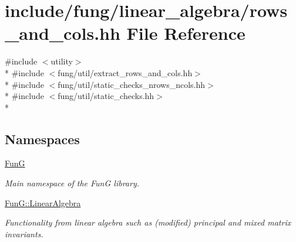 \hypertarget{rows__and__cols_8hh}{\section{include/fung/linear\-\_\-algebra/rows\-\_\-and\-\_\-cols.hh File Reference}
\label{rows__and__cols_8hh}
}
{\ttfamily \#include $<$utility$>$}\\*
{\ttfamily \#include $<$fung/util/extract\-\_\-rows\-\_\-and\-\_\-cols.\-hh$>$}\\*
{\ttfamily \#include $<$fung/util/static\-\_\-checks\-\_\-nrows\-\_\-ncols.\-hh$>$}\\*
{\ttfamily \#include $<$fung/util/static\-\_\-checks.\-hh$>$}\\*
\subsection*{Namespaces}
\begin{DoxyCompactItemize}
\item 
\hyperlink{namespaceFunG}{Fun\-G}
\begin{DoxyCompactList}\small\item\em Main namespace of the Fun\-G library. \end{DoxyCompactList}\item 
\hyperlink{namespaceFunG_1_1LinearAlgebra}{Fun\-G\-::\-Linear\-Algebra}
\begin{DoxyCompactList}\small\item\em Functionality from linear algebra such as (modified) principal and mixed matrix invariants. \end{DoxyCompactList}\end{DoxyCompactItemize}
